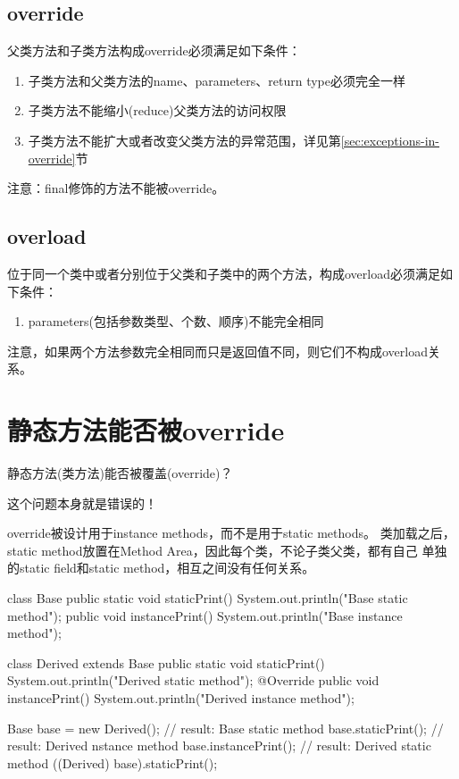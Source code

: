 \documentclass[a4paper,11pt]{article}
\begin{document}
\subsection[override]{override}
父类方法和子类方法构成override必须满足如下条件：

\begin{enumerate}
  \item 子类方法和父类方法的name、parameters、return type必须完全一样
  \item 子类方法不能缩小(reduce)父类方法的访问权限
  \item 子类方法不能扩大或者改变父类方法的异常范围，详见第\ref{sec:exceptions-in-override}节
\end{enumerate}

注意：final修饰的方法不能被override。

\subsection[overload]{overload}
位于同一个类中或者分别位于父类和子类中的两个方法，构成overload必须满足如下条件：

\begin{enumerate}
  \item parameters(包括参数类型、个数、顺序)不能完全相同
\end{enumerate}

注意，如果两个方法参数完全相同而只是返回值不同，则它们不构成overload关系。

\section[静态方法能否被override]{静态方法能否被override}
静态方法(类方法)能否被覆盖(override)？

这个问题本身就是错误的！

override被设计用于instance methods，而不是用于static methods。
类加载之后，static method放置在Method Area，因此每个类，不论子类父类，都有自己
单独的static field和static method，相互之间没有任何关系。

\begin{javacode}
class Base {
  public static void staticPrint() {
    System.out.println("Base static method");
  }
  public void instancePrint() {
    System.out.println("Base instance method");
  }
}

class Derived extends Base {
  public static void staticPrint() {
    System.out.println("Derived static method");
  }
  @Override
  public void instancePrint() {
    System.out.println("Derived instance method");
  }
}

Base base = new Derived();
// result: Base static method
base.staticPrint();
// result: Derived nstance method
base.instancePrint();
// result: Derived static method
((Derived) base).staticPrint();
\end{javacode}
\end{document}

